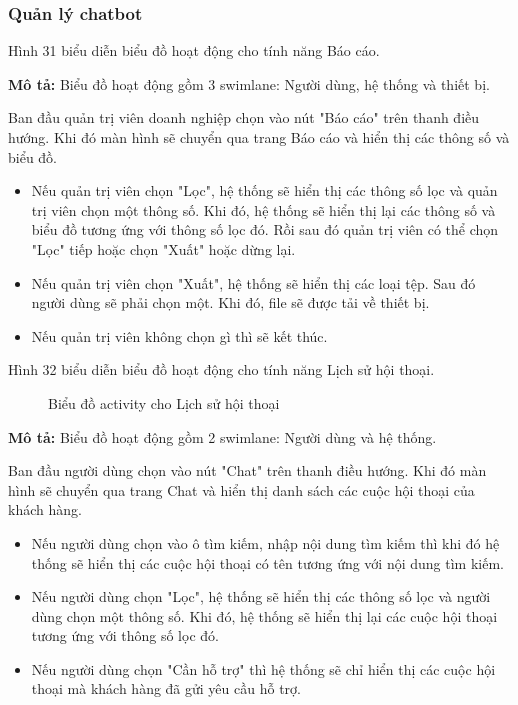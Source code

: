 \subsubsection{Quản lý chatbot}
Hình 31 biểu diễn biểu đồ hoạt động cho tính năng Báo cáo.

\textbf{Mô tả:}
Biểu đồ hoạt động gồm 3 swimlane: Người dùng, hệ thống và thiết bị.

Ban đầu quản trị viên doanh nghiệp chọn vào nút "Báo cáo" trên thanh điều hướng. Khi đó màn hình sẽ chuyển qua trang Báo cáo và hiển thị các thông số và biểu đồ.
\begin{itemize}
    \item Nếu quản trị viên chọn "Lọc", hệ thống sẽ hiển thị các thông số lọc và quản trị viên chọn một thông số. Khi đó, hệ thống sẽ hiển thị lại các thông số và biểu đồ tương ứng với thông số lọc đó. Rồi sau đó quản trị viên có thể chọn "Lọc" tiếp hoặc chọn "Xuất" hoặc dừng lại.
    \item Nếu quản trị viên chọn "Xuất", hệ thống sẽ hiển thị các loại tệp. Sau đó người dùng sẽ phải chọn một. Khi đó, file sẽ được tải về thiết bị. 
    \item Nếu quản trị viên không chọn gì thì sẽ kết thúc.
\end{itemize}
Hình 32 biểu diễn biểu đồ hoạt động cho tính năng Lịch sử hội thoại.

\begin{figure}[H]
    \centering
     
    \vspace{0.5cm}
    \caption{Biểu đồ activity cho Lịch sử hội thoại}
    \label{fig:enter-label}
\end{figure}

\textbf{Mô tả:}
Biểu đồ hoạt động gồm 2 swimlane: Người dùng và hệ thống.

Ban đầu người dùng chọn vào nút "Chat" trên thanh điều hướng. Khi đó màn hình sẽ chuyển qua trang Chat và hiển thị danh sách các cuộc hội thoại của khách hàng.
\begin{itemize}
    \item Nếu người dùng chọn vào ô tìm kiếm, nhập nội dung tìm kiếm thì khi đó hệ thống sẽ hiển thị các cuộc hội thoại có tên tương ứng với nội dung tìm kiếm.
    \item Nếu người dùng chọn "Lọc", hệ thống sẽ hiển thị các thông số lọc và người dùng chọn một thông số. Khi đó, hệ thống sẽ hiển thị lại các cuộc hội thoại tương ứng với thông số lọc đó. 
    \item Nếu người dùng chọn "Cần hỗ trợ" thì hệ thống sẽ chỉ hiển thị các cuộc hội thoại mà khách hàng đã gửi yêu cầu hỗ trợ.
\end{itemize}

